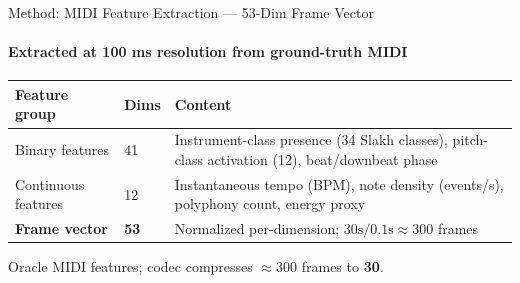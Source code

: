 \documentclass[aspectratio=169,11pt]{beamer}
\begin{document}
\begin{frame}{Method: MIDI Feature Extraction — 53-Dim Frame Vector}
  \framesubtitle{Extracted at 100 ms resolution from ground-truth MIDI}

  {\small
  \begin{tabular}{p{3.5cm}p{1.2cm}p{7.0cm}}
    \toprule
    \textbf{Feature group} & \textbf{Dims} & \textbf{Content} \\
    \midrule
    Binary features & 41 & Instrument-class presence (34 Slakh classes),
                           pitch-class activation (12), beat/downbeat phase \\
    Continuous features & 12 & Instantaneous tempo (BPM), note density (events/s),
                               polyphony count, energy proxy \\
    \midrule
    \textbf{Frame vector} & \textbf{53} & Normalized per-dimension;
                                          $30\mathrm{s}/0.1\mathrm{s}\approx300$ frames \\
    \bottomrule
  \end{tabular}}

  \smallskip
  \begin{tcolorbox}[key]
    Oracle MIDI features; codec compresses $\approx300$ frames to \textbf{30}.
  \end{tcolorbox}
\end{frame}
\end{document}
